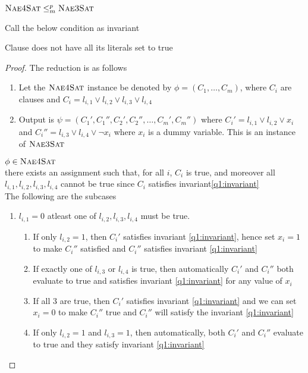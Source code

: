\begin{claim}
    $\textsc{Nae4Sat} \leq_m^p \textsc{Nae3Sat}$
\end{claim}
Call the below condition as invariant
\begin{invariant} \label{q1:invariant}
    Clause does not have all its literals set to true
\end{invariant}
\begin{proof}
    The reduction is as follows
    \begin{enumerate}
        \item Let the $\textsc{Nae4Sat}$ instance be denoted by $\phi = (C_1, \dots, C_m)$,
        where $C_i$ are clauses and $C_i = l_{i, 1} \vee l_{i, 2} \vee l_{i, 3} \vee l_{i, 4}$
        \item Output is $\psi = (C_1', C_1'', C_2', C_2'', \dots, C_m', C_m'')$ where 
        $C_i' = l_{i, 1} \vee l_{i, 2} \vee x_i$ and $C_i'' = l_{i, 3} \vee l_{i, 4} \vee \neg x_i$ where $x_i$ is a dummy variable. This is an instance of $\textsc{Nae3Sat}$
    \end{enumerate}
    $\phi \in \textsc{Nae4Sat}$\\
    \imp there exists an assignment such that, for all $i$, $C_i$ is true, and moreover all $l_{i, 1}, l_{i, 2}, l_{i, 3}, l_{i, 4}$ cannot be true since $C_i$ satisfies invariant\ref{q1:invariant}\\
    \imp The following are the subcases
    \begin{enumerate}
        \item $l_{i, 1} = 0$ \imp atleast one of $l_{i, 2}, l_{i, 3}, l_{i, 4}$ must be true. 
        \begin{enumerate}
            \item If only $l_{i, 2} =  1$, then $C_i'$ satisfies invariant \ref{q1:invariant}, hence set $x_i = 1$ to make $C_i''$ satisfied and $C_i''$ satisfies invariant \ref{q1:invariant}
            \item If exactly one of $l_{i, 3}$ or $l_{i, 4}$ is true, then automatically $C_i'$ and $C_i''$ both evaluate to true and satisfies invariant \ref{q1:invariant} for any value of $x_i$
            \item If all 3 are true, then $C_i'$ satisfies invariant \ref{q1:invariant} and we can set $x_i = 0$ to make $C_i''$ true and $C_i''$ will satisfy the invariant \ref{q1:invariant}
            \item If only $l_{i, 2} = 1$ and $l_{i, 3} = 1$, then automatically, both $C_i'$ and $C_i''$ evaluate to true and they satisfy invariant \ref{q1:invariant}

\end{enumerate}
\end{enumerate}
\end{proof}
